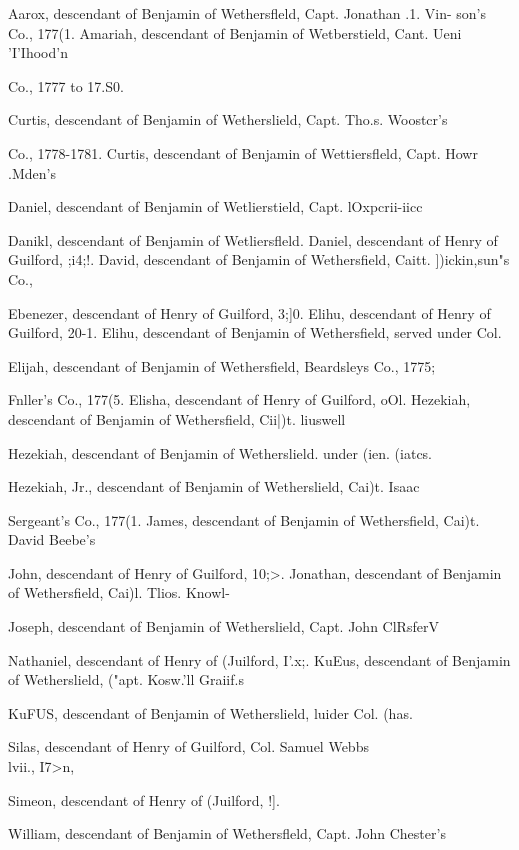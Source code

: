 \documentclass{book}
\begin{document}
Aarox, descendant of Benjamin of Wethersfleld, Capt. Jonathan .1. Vin- 
son's Co., 177(1. 
Amariah, descendant of Benjamin of Wetberstield, Cant. Ueni 'I'Ihood'n 

Co., 1777 to 17.S0.  

Curtis, descendant of Benjamin of Wetherslield, Capt. Tho.s. Woostcr's 

Co., 1778-1781. 
Curtis, descendant of Benjamin of Wettiersfleld, Capt. Howr .Mden's 

Daniel, descendant of Benjamin of Wetlierstield, Capt. lOxpcrii-iicc 

Danikl, descendant of Benjamin of Wetliersfleld. 
Daniel, descendant of Henry of Guilford, ;i4;!. 
David, descendant of Benjamin of Wethersfield, Caitt. ])ickin,sun"s Co., 

Ebenezer, descendant of Henry of Guilford, 3;]0. 
Elihu, descendant of Henry of Guilford, 20-1. 
Elihu, descendant of Benjamin of Wethersfield, served under Col. 

Elijah, descendant of Benjamin of Wethersfield, Beardsleys Co., 1775; 

Fnller's Co., 177(5. 
Elisha, descendant of Henry of Guilford, oOl. 
Hezekiah, descendant of Benjamin of Wethersfield, Cii|)t. liuswell 

Hezekiah, descendant of Benjamin of Wetherslield. under (ien. (iatcs. 

Hezekiah, Jr., descendant of Benjamin of Wetherslield, Cai)t. Isaac 

Sergeant's Co., 177(1. 
James, descendant of Benjamin of Wethersfield, Cai)t. David Beebe's 

John, descendant of Henry of Guilford, 10;>. 
Jonathan, descendant of Benjamin of Wethersfield, Cai)l. Tlios. Knowl- 

Joseph, descendant of Benjamin of Wetherslield, Capt. John ClRsferV 

Nathaniel, descendant of Henry of (Juilford, I'.x;. 
KuEus, descendant of Benjamin of Wetherslield, ("apt. Kosw.'ll Graiif.s 

KuFUS, descendant of Benjamin of Wetherslield, luider Col. (has. 

Silas, descendant of Henry of Guilford, Col. Samuel Webbs \\lvii., I7>n, 

Simeon, descendant of Henry of (Juilford, !]. 




William, descendant of Benjamin of Wethersfleld, Capt. John Chester's 
\end{document}
